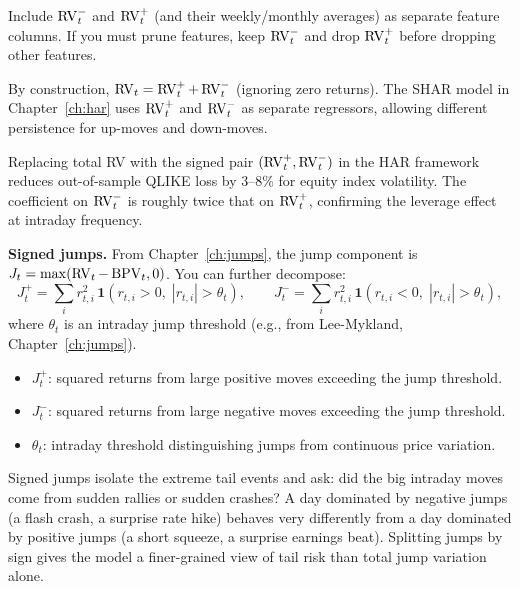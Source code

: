 \begin{projectconnection}
Include $\operatorname{RV}_t^-$ and $\operatorname{RV}_t^+$ (and their weekly/monthly averages) as separate feature columns. If you must prune features, keep $\operatorname{RV}_t^-$ and drop $\operatorname{RV}_t^+$ before dropping other features.
\end{projectconnection}

By construction, $\operatorname{RV}_t = \operatorname{RV}_t^+ + \operatorname{RV}_t^-$ (ignoring zero returns).
The SHAR model in Chapter~\ref{ch:har} uses $\operatorname{RV}_t^+$ and $\operatorname{RV}_t^-$ as separate regressors, allowing different persistence for up-moves and down-moves.

\begin{keyresult}
Replacing total RV with the signed pair $(\operatorname{RV}_t^+, \operatorname{RV}_t^-)$ in the HAR framework reduces out-of-sample QLIKE loss by 3--8\% for equity index volatility.
The coefficient on $\operatorname{RV}_t^-$ is roughly twice that on $\operatorname{RV}_t^+$, confirming the leverage effect at intraday frequency.
\end{keyresult}

\textbf{Signed jumps.}
From Chapter~\ref{ch:jumps}, the jump component is $J_t = \max(\operatorname{RV}_t - \operatorname{BPV}_t, 0)$.
You can further decompose:
\begin{equation}\label{eq:signed-jumps}
J_t^+ = \sum_{i} r_{t,i}^2 \,\mathbf{1}(r_{t,i} > 0,\; |r_{t,i}| > \theta_t), \qquad
J_t^- = \sum_{i} r_{t,i}^2 \,\mathbf{1}(r_{t,i} < 0,\; |r_{t,i}| > \theta_t),
\end{equation}
where $\theta_t$ is an intraday jump threshold (e.g., from Lee-Mykland, Chapter~\ref{ch:jumps}).
\begin{itemize}[nosep]
  \item $J_t^+$: squared returns from large positive moves exceeding the jump threshold.
  \item $J_t^-$: squared returns from large negative moves exceeding the jump threshold.
  \item $\theta_t$: intraday threshold distinguishing jumps from continuous price variation.
\end{itemize}

\begin{intuition}
Signed jumps isolate the extreme tail events and ask: did the big intraday moves come from sudden rallies or sudden crashes? A day dominated by negative jumps (a flash crash, a surprise rate hike) behaves very differently from a day dominated by positive jumps (a short squeeze, a surprise earnings beat). Splitting jumps by sign gives the model a finer-grained view of tail risk than total jump variation alone.
\end{intuition}

